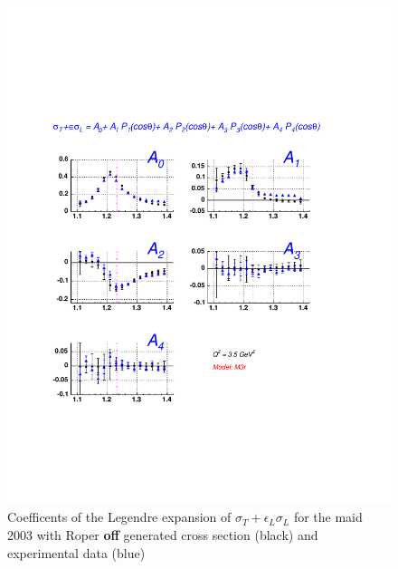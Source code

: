 \begin{figure}[h]
 \begin{center}
 \includegraphics[width = 12cm, bb=30 130 540 700]{analysis/img/A_comp_m03r} 
  \caption[Coefficents of the Legendre expansion of $\sigma_T+\epsilon_L\sigma_L$ for the maid 2003 with Roper {\bf off} 
  generated cross 
  section  and experimental data ]
{ Coefficents of the Legendre expansion of $\sigma_T+\epsilon_L\sigma_L$ for the maid 2003 with Roper {\bf off}  generated cross 
  section (black) and experimental data (blue) }
 \label{fig:A_comp_m03r}
\end{center}
\end{figure}



% 
% 
% 
% 


